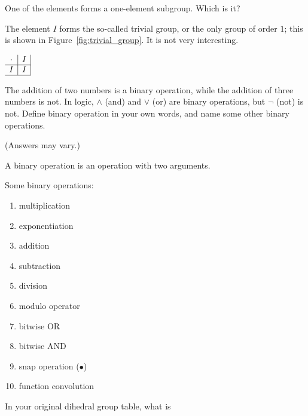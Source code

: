 \documentclass[../gatm_answers.tex]{subfiles}
\begin{document}
\begin{outer_problem}
\item One of the elements forms a one-element subgroup. Which is it?
\end{outer_problem}

The element $I$ forms the so-called trivial group, or the only group of order $1$; this is shown in Figure~\ref{fig:trivial_group}. It is not very interesting.
\begin{center}
$\begin{array}{c|c|}
\cdot & I \\ \hline
I & I \\ \hline
\end{array}$
\label{fig:trivial_group}
\end{center}

\begin{outer_problem}
\item The addition of two numbers is a binary operation, while the addition of three numbers is not. In logic, $\land$ (and) and $\lor$ (or) are binary operations, but $\lnot$ (not) is not. Define binary operation in your own words, and name some other binary operations.
\end{outer_problem}

(Answers may vary.)

A binary operation is an operation with two arguments.

Some binary operations:
\begin{multicols}{4}
\begin{enumerate}
\item multiplication
\item exponentiation
\item addition
\item subtraction
\item division
\item modulo operator
\item bitwise OR
\item bitwise AND
\item snap operation ($\bullet$)
\item function convolution
\end{enumerate}
\end{multicols}

\begin{outer_problem}
\item In your original dihedral group table, what is
\end{outer_problem}
\end{document}
